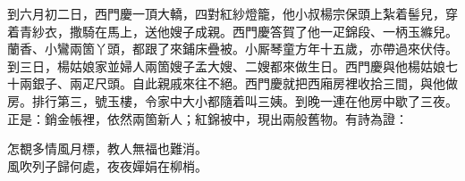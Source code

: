 到六月初二日，西門慶一頂大轎，四對紅紗燈籠，他小叔楊宗保頭上紮着髻兒，穿着青紗衣，撒騎在馬上，送他嫂子成親。西門慶答賀了他一疋錦段、一柄玉縧兒。蘭香、小鸞兩箇丫頭，都跟了來鋪床疊被。小厮琴童方年十五歲，亦帶過來伏侍。到三日，楊姑娘家並婦人兩箇嫂子孟大嫂、二嫂都來做生日。西門慶與他楊姑娘七十兩銀子、兩疋尺頭。自此親戚來往不絕。西門慶就把西廂房裡收拾三間，與他做房。排行第三，號玉樓，令家中大小都隨着叫三姨。到晚一連在他房中歇了三夜。正是：銷金帳裡，依然兩箇新人；紅錦被中，現出兩般舊物。有詩為證：

\begin{myquote} 
怎覩多情風月標，教人無福也難消。\\風吹列子歸何處，夜夜嬋娟在柳梢。
\end{myquote} 
